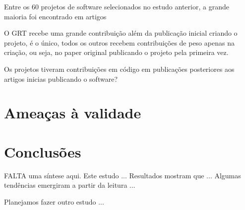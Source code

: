 Entre os 60 projetos de software selecionados no estudo anterior, a grande maioria
foi encontrado em artigos 

O GRT recebe uma grande contribuição além da publicação inicial criando o projeto,
é o único, todos os outros recebem contribuições de peso apenas na criação, ou seja,
no paper original publicando o projeto pela primeira vez.

Os projetos tiveram contribuições em código em publicações posteriores aos
artigos inicias publicando o software?


%



\section{Ameaças à validade}

\section{Conclusões} \label{estudo2:conclusoes} %

FALTA uma síntese aqui. 
Este estudo ...
Resultados mostram que ...
Algumas tendências emergiram a partir da leitura ...

Planejamos fazer outro estudo ... 



%
%
%
%
%
%

